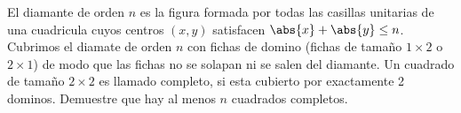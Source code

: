 \begin{problem}
    El diamante de orden $n$ es la figura formada por todas las casillas unitarias de una cuadricula cuyos centros $(x,y)$
    satisfacen $\abs{x}+\abs{y} \leq n$. \\
    Cubrimos el diamate de orden $n$ con fichas de domino (fichas de tamaño $1\times 2$ o $2\times 1$) de modo que las 
    fichas no se solapan ni se salen del diamante. Un cuadrado de tamaño $2\times 2$ es llamado completo, si esta cubierto
    por exactamente 2 dominos. Demuestre que hay al menos $n$ cuadrados completos.

    \label{24MEXIBEROTSTA2}
\end{problem}